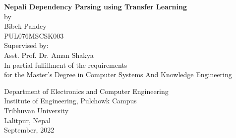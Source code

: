 \begin{titlingpage}
\begin{center}
\textbf{Nepali Dependency Parsing using Transfer Learning}\\
\vspace{2cm}
by\\
Bibek Pandey\\
PUL076MSCSK003\\
\vspace{2cm}
Supervised by:\\
    Asst. Prof. Dr. Aman Shakya\\
\vspace{2cm}
In partial fulfillment of the requirements\\
for the Master’s Degree in Computer Systems And Knowledge Engineering
\vspace{2cm}

Department of Electronics and Computer Engineering\\
Institute of Engineering, Pulchowk Campus\\
Tribhuvan University\\
Lalitpur, Nepal\\
\vspace{2cm}
September, 2022
\end{center}
\end{titlingpage}
\newpage

